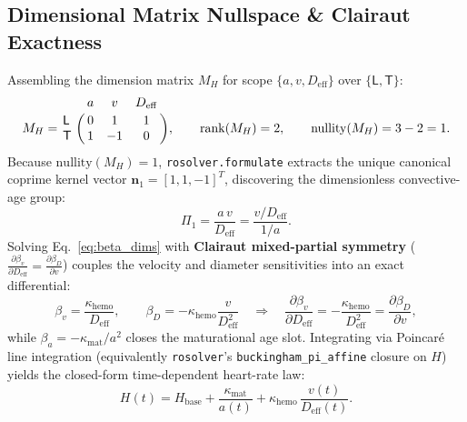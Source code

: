 \documentclass[11pt,a4paper]{article}
\newcommand{\pd}[2]{\frac{\partial #1}{\partial #2}}
\newcommand{\Deff}{D_{\mathrm{eff}}}
\begin{document}
\subsection{Dimensional Matrix Nullspace \& Clairaut Exactness}
Assembling the dimension matrix $M_H$ for scope $\{a, v, \Deff\}$ over $\{\mathsf{L}, \mathsf{T}\}$:
\begin{equation}
  M_H = \bordermatrix{
    & a & v & \Deff \cr
    \mathsf{L} & 0 & 1 & 1 \cr
    \mathsf{T} & 1 & -1 & 0
  },
  \qquad \mathrm{rank}(M_H) = 2, \qquad \mathrm{nullity}(M_H) = 3 - 2 = 1.
\end{equation}
Because $\mathrm{nullity}(M_H) = 1$, \texttt{rosolver.formulate} extracts the unique canonical coprime kernel vector $\mathbf{n}_1 = [1, 1, -1]^T$, discovering the dimensionless convective-age group:
\begin{equation}
  \Pi_1 = \frac{a\,v}{\Deff} = \frac{v / \Deff}{1 / a}.
  \label{eq:pi1_forward}
\end{equation}
Solving Eq.~\eqref{eq:beta_dims} with \textbf{Clairaut mixed-partial symmetry} ($\pd{\beta_v}{\Deff} = \pd{\beta_D}{v}$) couples the velocity and diameter sensitivities into an exact differential:
\begin{equation}
  \beta_v = \frac{\kappa_{\mathrm{hemo}}}{\Deff}, \qquad
  \beta_D = -\kappa_{\mathrm{hemo}}\frac{v}{\Deff^2}
  \quad\Longrightarrow\quad
  \pd{\beta_v}{\Deff} = -\frac{\kappa_{\mathrm{hemo}}}{\Deff^2} = \pd{\beta_D}{v},
\end{equation}
while $\beta_a = -\kappa_{\mathrm{mat}}/a^2$ closes the maturational age slot. Integrating via Poincar\'e line integration (equivalently \texttt{rosolver}'s \texttt{buckingham\_pi\_affine} closure on $H$) yields the closed-form time-dependent heart-rate law:
\begin{equation}
  H(t) = H_{\mathrm{base}} + \frac{\kappa_{\mathrm{mat}}}{a(t)} + \kappa_{\mathrm{hemo}}\,\frac{v(t)}{\Deff(t)}.
  \label{eq:H_closed}
\end{equation}
\end{document}
